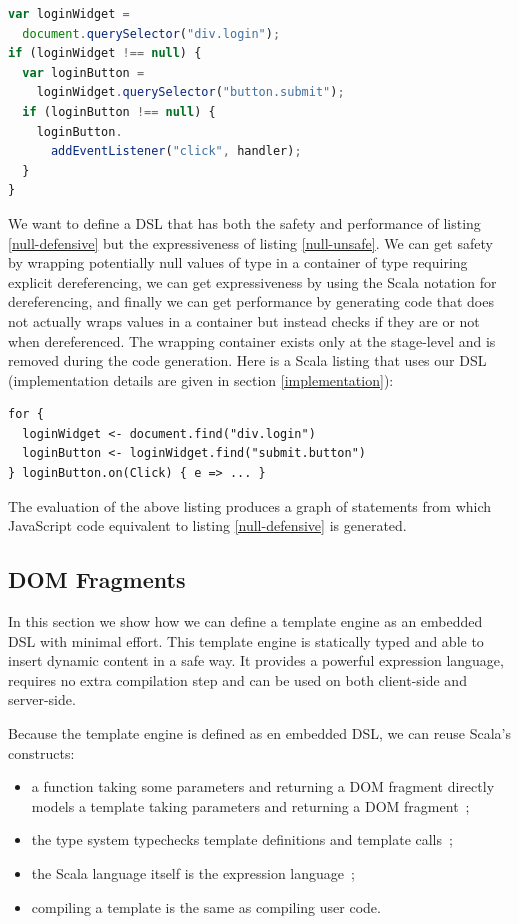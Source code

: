 \documentclass[preprint]{sigplanconf}
\begin{document}
\begin{lstlisting}[language=JavaScript,label=null-defensive,caption=Defensive programming to handle null references]
var loginWidget =
  document.querySelector("div.login");
if (loginWidget !== null) {
  var loginButton =
    loginWidget.querySelector("button.submit");
  if (loginButton !== null) {
    loginButton.
      addEventListener("click", handler);
  }
}
\end{lstlisting}

We want to define a DSL that has both the safety and performance of listing \ref{null-defensive} but the
expressiveness of listing \ref{null-unsafe}. We can get safety by wrapping potentially null values of type
 in a container of type  requiring explicit dereferencing, we can get
expressiveness by using the Scala  notation for dereferencing, and finally we can get performance by
generating code that does not actually wraps values in a container but instead checks if they are  or not
when dereferenced. The wrapping container exists only at the stage-level and is removed during the code generation.
Here is a Scala listing that uses our DSL (implementation details are given in section \ref{implementation}):

\begin{lstlisting}
for {
  loginWidget <- document.find("div.login")
  loginButton <- loginWidget.find("submit.button")
} loginButton.on(Click) { e => ... }
\end{lstlisting}

The evaluation of the above listing produces a graph of statements from which JavaScript code equivalent to
listing \ref{null-defensive} is generated.

\subsection{DOM Fragments}


In this section we show how we can define a template engine as an embedded DSL with minimal effort. This template
engine is statically typed and able to insert dynamic content in a safe way. It provides a powerful expression
language, requires no extra compilation step and can be used on both client-side and server-side.

Because the template engine is defined as en embedded DSL, we can reuse Scala’s constructs:

\begin{itemize}
\item a function taking some parameters and returning a DOM fragment directly models a template taking parameters and
returning a DOM fragment~;
\item the type system typechecks template definitions and template calls~;
\item the Scala language itself is the expression language~;
\item compiling a template is the same as compiling user code.
\end{itemize}
\end{document}
